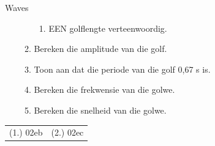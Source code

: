 \begin{eocexercises}{Waves}
\begin{enumerate}[noitemsep, label=\textbf{\arabic*}. ]
\begin{enumerate}[noitemsep, label=\textbf{\alph*}. ]
\begin{enumerate}[noitemsep, label=\textbf{\roman*}. ]
\item EEN golflengte verteenwoordig.\end{enumerate}
        \item Bereken die amplitude van die golf.
\item Toon aan dat die periode van die golf 0,67 s is.
\item Bereken die frekwensie van die golwe.
\item Bereken die snelheid van die golwe.\end{enumerate}
         \end{enumerate}
  \label{m38806**end}
\practiceinfo
 \par \begin{tabular}[h]{cc}
(1.) 02eb  &  (2.) 02ec  & \end{tabular}

\end{eocexercises}

